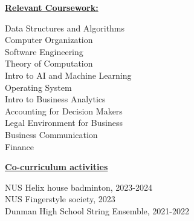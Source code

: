 \documentclass{article}
\begin{document}
\noindent \textbf{\underline{Relevant Coursework:}} \\
\vspace{-0.7cm} %
\begin{multicols}{3}
    \indent\textbullet{} Data Structures and Algorithms \\
    \indent\textbullet{} Computer Organization \\
    \indent\textbullet{} Software Engineering \\
    \indent\textbullet{} Theory of Computation \\
    \indent\textbullet{} Intro to AI and Machine Learning \\
    \indent\textbullet{} Operating System \\
    \indent\textbullet{} Intro to Business Analytics \\
    \indent\textbullet{} Accounting for Decision Makers \\
    \indent\textbullet{} Legal Environment for Business \\
    \indent\textbullet{} Business Communication \\
    \indent\textbullet{} Finance \\
\end{multicols}
\noindent \textbf{\underline{Co-curriculum activities}} \\
\vspace{-0.2cm}

\indent\textbullet{} NUS Helix house badminton, 2023-2024 \\
\indent\textbullet{} NUS Fingerstyle society, 2023 \\
\indent\textbullet{} Dunman High School String Ensemble, 2021-2022 \\
\end{document}
